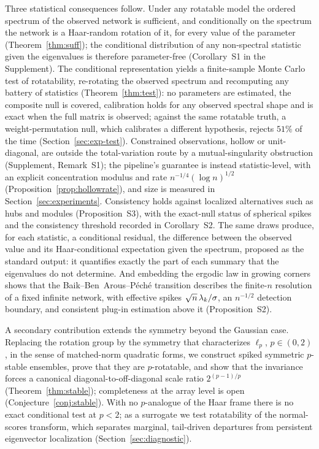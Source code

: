 Three statistical consequences follow. Under any rotatable model the
ordered spectrum of the observed network is sufficient, and
conditionally on the spectrum the network is a Haar-random rotation of
it, for every value of the parameter (Theorem~\ref{thm:suff}); the
conditional distribution of any non-spectral statistic given the
eigenvalues is therefore parameter-free (Corollary~S1 in the
Supplement). The conditional representation yields a finite-sample Monte Carlo
test of rotatability, re-rotating the observed spectrum and
recomputing any battery of statistics (Theorem~\ref{thm:test}): no
parameters are estimated, the composite null is covered, calibration holds for any observed spectral shape and is exact when
the full matrix is observed; against the same rotatable truth, a weight-permutation null, which calibrates a different hypothesis,
rejects $51\%$ of the time (Section~\ref{sec:exp-test}).
Constrained observations, hollow or unit-diagonal, are outside the
total-variation route by a mutual-singularity obstruction (Supplement,
Remark~S1); the pipeline's guarantee is instead statistic-level, with
an explicit concentration modulus and rate
$n^{-1/4}(\log n)^{1/2}$ (Proposition~\ref{prop:hollowrate}), and
size is measured in Section~\ref{sec:experiments}. Consistency holds
against localized alternatives such as hubs and modules
(Proposition~S3), with the exact-null status of spherical spikes and the consistency
threshold recorded in Corollary~S2. The same draws produce, for each statistic, a conditional residual,
the difference between the observed value and its Haar-conditional
expectation given the spectrum, proposed as the standard output: it
quantifies exactly the part of each summary that the eigenvalues do
not determine.
And embedding the ergodic law in growing corners shows that the
Baik--Ben~Arous--P\'ech\'e transition
\citep{baik2005phase,feral2007largest,benaych2011eigenvalues} describes
the finite-$n$ resolution of a fixed infinite network, with effective
spikes $\sqrt{n}\,\lambda_k/\sigma$, an $n^{-1/2}$ detection boundary, and
consistent plug-in estimation above it (Proposition~S2).

A secondary contribution extends the symmetry beyond the Gaussian case.
Replacing the rotation group by the symmetry that characterizes
$\ell_p$, $p\in(0,2)$, in the sense of matched-norm quadratic forms, we
construct spiked symmetric $p$-stable ensembles, prove that they are
$p$-rotatable, and show that the invariance forces a canonical
diagonal-to-off-diagonal scale ratio $2^{(p-1)/p}$
(Theorem~\ref{thm:stable}); completeness at the array level is open
(Conjecture~\ref{conj:stable}). With no $p$-analogue of the Haar frame
there is no exact conditional test at $p<2$; as a surrogate we test
rotatability of the normal-scores transform, which separates marginal,
tail-driven departures from persistent eigenvector localization
(Section~\ref{sec:diagnostic}).

